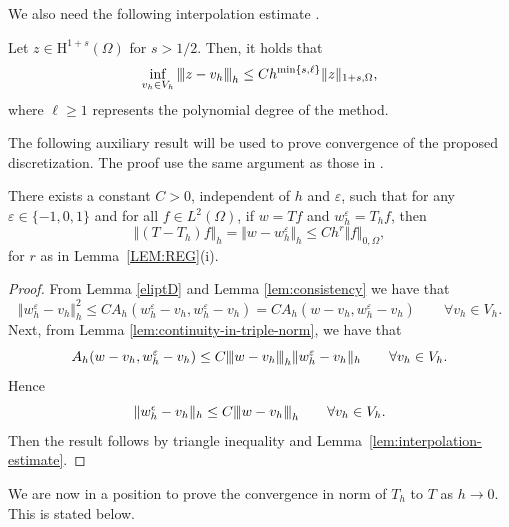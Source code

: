 \documentclass[onefignum,onetabnum,final]{siamart250211}
\numberwithin{equation}{section}
\newcommand\0{\boldsymbol{0}}
\renewcommand\O{\Omega}
\renewcommand\H{\mathrm{H}}
\newcommand\HusO{\H^{1+s}(\O)}
\newcommand{\vertiii}[1]{{\left\vert\kern-0.25ex\left\vert\kern-0.25ex\left\vert #1 
		\right\vert\kern-0.25ex\right\vert\kern-0.25ex\right\vert}}
\begin{document}
	We also need the following interpolation estimate \cite[Lemma 3.4]{juntunen2009nitsche}.
	\begin{lemma}\label{lem:interpolation-estimate}
		Let $z\in\HusO$ for $s>1/2$. Then, it holds that
		$$
		\inf_{v_h\in V_h}\vertiii{z-v_h}_h\leq Ch^{\min\{s,\ell\}}\Vert z \Vert_{1+s,\O},
		$$
		where $\ell\ge1$ represents the polynomial degree of the method.
	\end{lemma}
	
	The following auxiliary result will be used to prove convergence
	of the proposed discretization. The proof use the same argument
	as those in \cite{juntunen2009nitsche}.
	
	\begin{lemma}
		There exists a constant $C > 0$, independent of $h$ and $\varepsilon$, such that for any
		$\varepsilon\in\{- 1, 0, 1\}$ and for all $f\in L^2(\Omega)$,
		if $w=Tf$ and $w_h^\varepsilon=T_hf$, then
		$$
		\Vert(T-T_h)f\Vert_h=\Vert w-w_h^\varepsilon\Vert_h\le C h^r\Vert f\Vert_{0,\O},
		$$
		for $r$ as in Lemma~\ref{LEM:REG}(i).
		\end{lemma}
	\begin{proof}
		From Lemma \ref{eliptD} and Lemma \ref{lem:consistency} we have that
		$$
		\Vert w^{\varepsilon}_h - v_h\Vert_h^2\leq C A_h(w^{\varepsilon}_h
		-v_h,w^{\varepsilon}_h-v_h)= CA_h(w-v_h,w^{\varepsilon}_h-v_h) \qquad \forall v_h\in V_h.
		$$
		Next, from Lemma \ref{lem:continuity-in-triple-norm}, we have that
		$$
		A_h(w-v_h,w^{\varepsilon}_h-v_h) \leq C\vertiii{ w-v_h}_h \Vert w^{\varepsilon}_h-v_h\Vert_h \qquad \forall v_h\in V_h.
		$$
		Hence
		$$
		\Vert w_h^{\epsilon}-v_h\Vert_h\leq C \vertiii{w-v_h}_h \qquad \forall v_h\in V_h.
		$$
		Then the result follows by triangle inequality and Lemma~\ref{lem:interpolation-estimate}.
	\end{proof}
	
	We are now in a position to prove the convergence in norm of $T_h$ to $T$ as $h\to0$. This is stated below.
	
\end{document}
